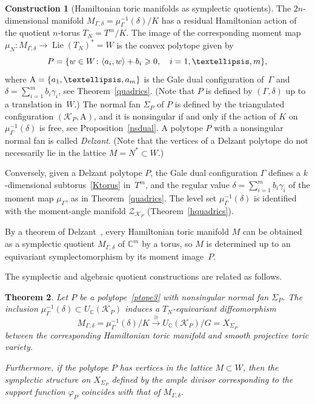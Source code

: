 \documentclass[a4paper]{amsart}
\newtheorem{theorem}{Theorem}[section]
\theoremstyle{definition}
\newtheorem{construction}[theorem]{Construction}
\theoremstyle{remark}
\numberwithin{equation}{section}
\def\C{\mathbb C}
\newcommand{\mb}[1]{{\textbf {\textit#1}}}
\renewcommand{\ge}{\geqslant}
\newcommand{\<}{\langle}
\renewcommand{\>}{\rangle}
\begin{document}
\begin{construction}[Hamiltonian toric manifolds as symplectic quotients]
The $2n$-dimensional manifold $M_{\Gamma,\delta}=\mu_\Gamma^{-1}(\delta)/K$ has a residual Hamiltonian action of the quotient $n$-torus $T_N=T^m/K$. The image of the corresponding moment map $\mu_N\colon M_{\Gamma,\delta}\to\mathop\mathrm{Lie}(T_N)^*=W$ is the convex polytope given by
\begin{equation}\label{ptope3}
  P=\{\mb w\in W\colon\langle \mb a_i,\mb w\rangle+b_i\ge0,\quad i=1,\ldots,m\},
\end{equation}
where $\mathrm A=\{\mb a_1,\ldots,\mb a_m\}$ is the Gale dual configuration of~$\Gamma$ and $\delta=\sum_{i=1}^mb_i\gamma_i$, see Theorem~\ref{quadrics}. (Note that $P$ is defined by $(\Gamma,\delta)$ up to a translation in~$W$.) The normal fan $\Sigma_P$ of $P$ is defined by the triangulated configuration $(\mathcal K_P,\mathrm A)$, and it is nonsingular if and only if the action of $K$ on $\mu_\Gamma^{-1}(\delta)$ is free, see Proposition~\ref{nsdual}. A polytope $P$ with a nonsingular normal fan is called \emph{Delzant}. (Note that the vertices of a Delzant polytope do not necessarily lie in the lattice $M=N^*\subset W$.) 

Conversely, given a Delzant polytope $P$, the Gale dual configuration $\Gamma$ defines a $k$-dimensional subtorus~\eqref{Ktorus} in~$T^m$, and the regular value $\delta=\sum_{i=1}^mb_i\gamma_i$ of the moment map $\mu_\Gamma$, as in Theorem~\ref{quadrics}. The level set $\mu_\Gamma^{-1}(\delta)$ is identified with the moment-angle manifold $\mathcal Z_{\mathcal K_P}$ (Theorem~\ref{hquadrics}).

By a theorem of Delzant~\cite{delz88}, every Hamiltonian toric manifold $M$ can be obtained as a symplectic quotient $M_{\Gamma,\delta}$ of $\C^m$ by a torus, so $M$ is determined up to an equivariant symplectomorphism by its moment image~$P$.
\end{construction}

The symplectic and algebraic quotient constructions are related as follows.

\begin{theorem}\label{algsym}
Let $P$ be a polytope~\eqref{ptope3} with nonsingular normal fan $\Sigma_P$. The inclusion $\mu_\Gamma^{-1}(\delta)\subset U_\C(\mathcal K_P)$ induces a $T_N$-equivariant diffeomorphism
\[
  M_{\Gamma,\delta}=\mu_\Gamma^{-1}(\delta)/K\stackrel\cong\longrightarrow
  U_\C(\mathcal K_P)/G=X_{\Sigma_P}
\]
between the corresponding Hamiltonian toric manifold and smooth projective toric variety.

Furthermore, if the polytope $P$ has vertices in the lattice $M\subset W$, then the symplectic structure on $X_{\Sigma_P}$ defined by the ample divisor corresponding to the support function $\varphi_P$ coincides with that of $M_{\Gamma,\delta}$.
\end{theorem}
\end{document}
